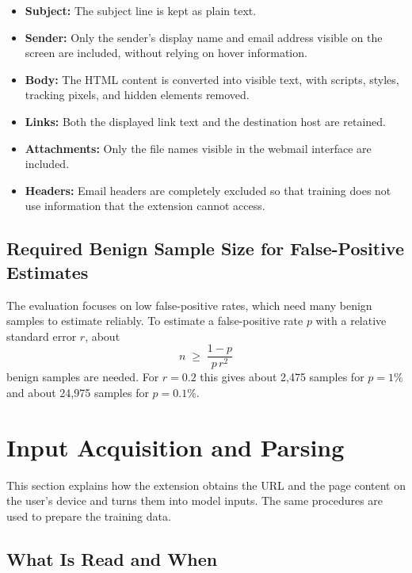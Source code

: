\documentclass{FastFyp}
\begin{document}
\begin{itemize}
    \item \textbf{Subject:} The subject line is kept as plain text.

    \item \textbf{Sender:} Only the sender's display name and email address visible on the screen are included, without relying on hover information.

    \item \textbf{Body:} The HTML content is converted into visible text, with scripts, styles, tracking pixels, and hidden elements removed.

    \item \textbf{Links:} Both the displayed link text and the destination host are retained.

    \item \textbf{Attachments:} Only the file names visible in the webmail interface are included.

    \item \textbf{Headers:} Email headers are completely excluded so that training does not use information that the extension cannot access.
\end{itemize}

\subsection{Required Benign Sample Size for False-Positive Estimates}
\label{sec:fpr-size}
The evaluation focuses on low false-positive rates, which need many benign samples to estimate reliably. To estimate a false-positive rate $p$ with a relative standard error $r$, about
\begin{equation}
n \;\ge\; \frac{1-p}{p\, r^{2}}
\end{equation}
benign samples are needed. For $r = 0.2$ this gives about 2{,}475 samples for $p = 1\%$ and about 24{,}975 samples for $p = 0.1\%$.

\section{Input Acquisition and Parsing}
\label{sec:input-acquisition}

This section explains how the extension obtains the URL and the page content on the user's device and turns them into model inputs. The same procedures are used to prepare the training data.

\subsection{What Is Read and When}
\end{document}

